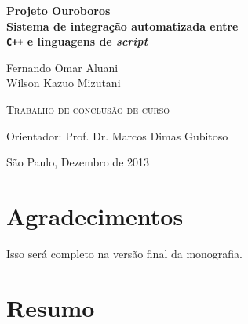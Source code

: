 \documentclass[11pt,twoside,a4paper]{book}
\begin{document}
\frontmatter 
\fancyhead[RO]{{\footnotesize\rightmark}\hspace{2em}\thepage}
\setcounter{tocdepth}{2}
\fancyhead[LE]{\thepage\hspace{2em}\footnotesize{\leftmark}}
\fancyhead[RE,LO]{}
\fancyhead[RO]{{\footnotesize\rightmark}\hspace{2em}\thepage}

\onehalfspacing  %

\thispagestyle{empty}
\begin{center}
  \vspace*{2.3cm}
  \textsf{\textbf{
    {\LARGE Projeto Ouroboros }\\
    {
      \Large Sistema de integração automatizada entre \\
      \texttt{C++} e linguagens de \emph{script}
    }
  }}
    
  \vspace*{1.2cm}
  \textsf{\Large{Fernando Omar Aluani}} \\
  \textsf{\Large{Wilson Kazuo Mizutani}}
  
  \vskip 2cm
  \textsc{Trabalho de conclusão de curso} 
  
  \vskip 10cm
  \textsf{Orientador: Prof. Dr. Marcos Dimas Gubitoso}

  \vskip 3cm
  
  \normalsize{São Paulo, Dezembro de 2013}
\end{center}


\chapter*{Agradecimentos}

Isso será completo na versão final da monografia.

\chapter*{Resumo}
\end{document}

